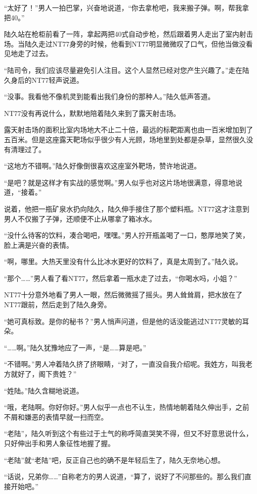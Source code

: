 “太好了！”男人一拍巴掌，兴奋地说道，“你去拿枪吧，我来搬子弹。啊，帮我拿把40。”

陆久站在枪柜前看了一阵，拿起两把40式自动步枪，然后跟着男人走出了室内射击场。当陆久走过NT77身旁的时候，他看到NT77明显微微叹了口气，但他当做没看见地走了过去。

“陆司令，我们应该尽量避免引人注目。这个人显然已经对您产生兴趣了。”走在陆久身后的NT77轻声说道。

“没事。我看他不像机灵到能看出我们身份的那种人。”陆久低声答道。

NT77没有再说什么，默默地陪着陆久来到了露天射击场。

露天射击场的面积比室内场地大不止二十倍，最远的标靶距离也由一百米增加到了五百米。但是这座露天靶场似乎很少有人光顾，场地里到处都是杂草，显然很久没有清理过了。

“这地方不错啊。”陆久好像倒很喜欢这座室外靶场，赞许地说道。

“是吧？就是这样才有实战的感觉啊。”男人似乎也对这片场地很满意，得意地说道，“接着。”

说着，他把一瓶矿泉水扔向陆久，陆久伸手接住了那个塑料瓶。NT77这才注意到男人不仅搬了子弹，还顺便不止从哪拿了箱冰水。

“没什么待客的饮料，凑合喝吧，嘿嘿。”男人拧开瓶盖喝了一口，憨厚地笑了笑，脸上满是兴奋的表情。

“啊，哪里。大热天里没有什么比冰水更好的饮料了，真是太周到了。”陆久说。

“那个……”男人看了看NT77，然后拿着一瓶水走了过去，“你喝水吗，小姐？”

NT77十分意外地看了男人一眼，然后微微摇了摇头。男人耸耸肩，把水放在了NT77跟前，然后走到了陆久身旁。

“她可真标致。是你的秘书？”男人悄声问道，但是他的话没能逃过NT77灵敏的耳朵。

“……啊。”陆久犹豫地应了一声，“是……算是吧。”

“不错啊。”男人冲着陆久挤了挤眼睛，“对了，一直没自我介绍呢。我姓方，叫我老方就好了，阁下贵姓？”

“姓陆。”陆久含糊地说道。

“哦，老陆啊。你好你好。”男人似乎一点也不认生，热情地朝着陆久伸出手，之前不屑和嫌恶的表情早就一扫而空。

“老陆”，陆久听到这个有些过于土气的称呼简直哭笑不得，但又不好意思说什么，只好伸出手和男人象征性地握了握。

“老陆”就“老陆”吧，反正自己也的确不是年轻后生了，陆久无奈地心想。

“话说，兄弟你……”自称老方的男人说道，“算了，说好了不问那些的。那么我们直接开始吧。”


